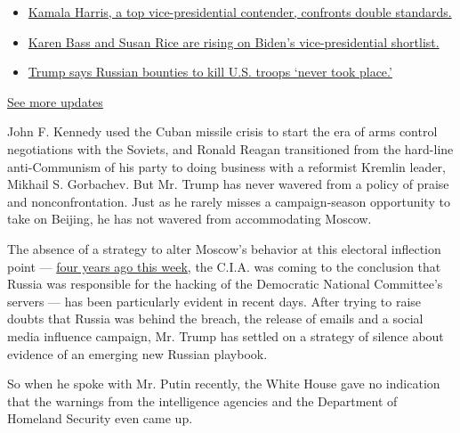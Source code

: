 \begin{itemize}
\tightlist
\item
  \href{https://www.nytimes.com/2020/07/31/us/elections/biden-vs-trump.html?action=click\&pgtype=Article\&state=default\&region=MAIN_CONTENT_1\&context=storylines_live_updates\#link-29fdff45}{Kamala
  Harris, a top vice-presidential contender, confronts double
  standards.}
\item
  \href{https://www.nytimes.com/2020/07/31/us/elections/biden-vs-trump.html?action=click\&pgtype=Article\&state=default\&region=MAIN_CONTENT_1\&context=storylines_live_updates\#link-13ec3d9c}{Karen
  Bass and Susan Rice are rising on Biden's vice-presidential
  shortlist.}
\item
  \href{https://www.nytimes.com/2020/07/31/us/elections/biden-vs-trump.html?action=click\&pgtype=Article\&state=default\&region=MAIN_CONTENT_1\&context=storylines_live_updates\#link-49e9a016}{Trump
  says Russian bounties to kill U.S. troops `never took place.'}
\end{itemize}

\href{https://www.nytimes.com/2020/07/31/us/elections/biden-vs-trump.html?action=click\&pgtype=Article\&state=default\&region=MAIN_CONTENT_1\&context=storylines_live_updates}{See
more updates}

John F. Kennedy used the Cuban missile crisis to start the era of arms
control negotiations with the Soviets, and Ronald Reagan transitioned
from the hard-line anti-Communism of his party to doing business with a
reformist Kremlin leader, Mikhail S. Gorbachev. But Mr. Trump has never
wavered from a policy of praise and nonconfrontation. Just as he rarely
misses a campaign-season opportunity to take on Beijing, he has not
wavered from accommodating Moscow.

The absence of a strategy to alter Moscow's behavior at this electoral
inflection point ---
\href{https://www.nytimes.com/2016/07/27/us/politics/spy-agency-consensus-grows-that-russia-hacked-dnc.html}{four
years ago this week}, the C.I.A. was coming to the conclusion that
Russia was responsible for the hacking of the Democratic National
Committee's servers --- has been particularly evident in recent days.
After trying to raise doubts that Russia was behind the breach, the
release of emails and a social media influence campaign, Mr. Trump has
settled on a strategy of silence about evidence of an emerging new
Russian playbook.

So when he spoke with Mr. Putin recently, the White House gave no
indication that the warnings from the intelligence agencies and the
Department of Homeland Security even came up.

